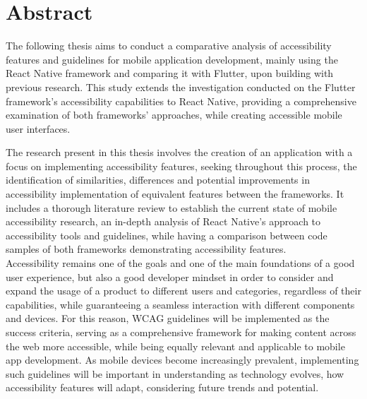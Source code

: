 \cleardoublepage
{}
{}
\begingroup
\let\clearpage\relax
\let\cleardoublepage\relax
\chapter*{Abstract}

The following thesis aims to conduct a comparative analysis of accessibility features and guidelines for mobile application development, mainly using the React Native framework and comparing it with Flutter, upon building with previous research. This study extends the investigation conducted on the Flutter framework's accessibility capabilities to React Native, providing a comprehensive examination of both frameworks' approaches, while creating accessible mobile user interfaces.

The research present in this thesis involves the creation of an application with a focus on implementing accessibility features, seeking throughout this process, the identification of similarities, differences and potential improvements in accessibility implementation of equivalent features between the frameworks. It includes a thorough literature review to establish the current state of mobile accessibility research, an in-depth analysis of React Native's approach to accessibility tools and guidelines, while having a comparison between code samples of both frameworks demonstrating accessibility features. \\

Accessibility remains one of the goals and one of the main foundations of a good user experience, but also a good developer mindset in order to consider and expand the usage of a product to different users and categories, regardless of their capabilities, while guaranteeing a seamless interaction with different components and devices. For this reason, WCAG guidelines will be implemented as the success criteria, serving as a comprehensive framework for making content across the web more accessible, while being equally relevant and applicable to mobile app development. As mobile devices become increasingly prevalent, implementing such guidelines will be important in understanding as technology evolves, how accessibility features will adapt, considering future trends and potential. 

\endgroup
\vfill
